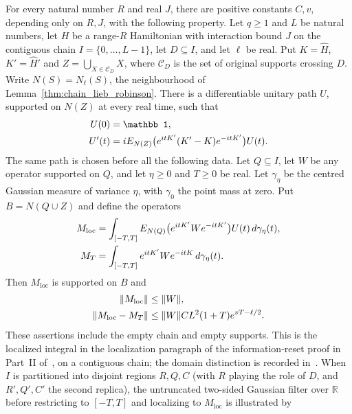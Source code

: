 \begin{lemma}
    \label{thm:chain_supported_gaussian_integral}
    \leanok
    For every natural number $R$ and real $J$, there are positive constants
    $C,v$, depending only on $R,J$, with the following property.
    Let $q\ge1$ and $L$ be natural numbers, let $H$ be a range-$R$
    Hamiltonian with interaction bound $J$ on the contiguous chain
    $I=\{0,\ldots,L-1\}$, let $D\subseteq I$, and let $\ell$ be real.
    Put $K=\widehat H$, $K'=\widehat H'$ and
    $Z=\bigcup_{X\in\mathcal C_D}X$, where $\mathcal C_D$ is the set of
    original supports crossing $D$. Write $N(S)=N_\ell(S)$, the neighbourhood of
    Lemma~\ref{thm:chain_lieb_robinson}.
    There is a differentiable unitary path $U$, supported on $N(Z)$ at
    every real time, such that
    \begin{align}
        U(0)  & =\mathbb 1,\notag                                  \\
        U'(t) & =iE_{N(Z)}\bigl(e^{itK'}(K'-K)e^{-itK'}\bigr)U(t).
    \end{align}
    The same path is chosen before all the following data.
    Let $Q\subseteq I$, let $W$ be any operator supported on $Q$,
    and let $\eta\ge0$ and $T\ge0$ be real.
    Let $\gamma_\eta$ be the centred Gaussian measure of variance $\eta$,
    with $\gamma_0$ the point mass at zero. Put $B=N(Q\cup Z)$ and
    define the operators
    \begin{align}
        M_{\mathrm{loc}} & =\int_{[-T,T]}
        E_{N(Q)}\bigl(e^{itK'}We^{-itK'}\bigr)U(t)\,d\gamma_\eta(t),\notag   \\
        M_T              & =\int_{[-T,T]}e^{itK'}We^{-itK}\,d\gamma_\eta(t).
    \end{align}
    Then $M_{\mathrm{loc}}$ is supported on $B$ and
    \begin{align}
        \|M_{\mathrm{loc}}\| & \le\|W\|,\notag                  \\
        \|M_{\mathrm{loc}}-M_T\|
                             & \le\|W\|C L^2(1+T)e^{vT-\ell/2}.
    \end{align}
    These assertions include the empty chain and empty supports.
    This is the localized integral in the localization paragraph of the
    information-reset proof in Part~II of~\cite{TNLean2026OneDimensional},
    on a contiguous chain; the domain distinction is recorded
    in~\cite{gap:tnlean_one_dimensional_connected_domain_scope}.
    When $I$ is partitioned into disjoint regions $R,Q,C$ (with $R$ playing
    the role of $D$, and $R',Q',C'$ the second replica), the untruncated
    two-sided Gaussian filter over $\mathbb R$ before restricting to
    $[-T,T]$ and localizing to $M_{\mathrm{loc}}$ is illustrated by
    
\end{lemma}
